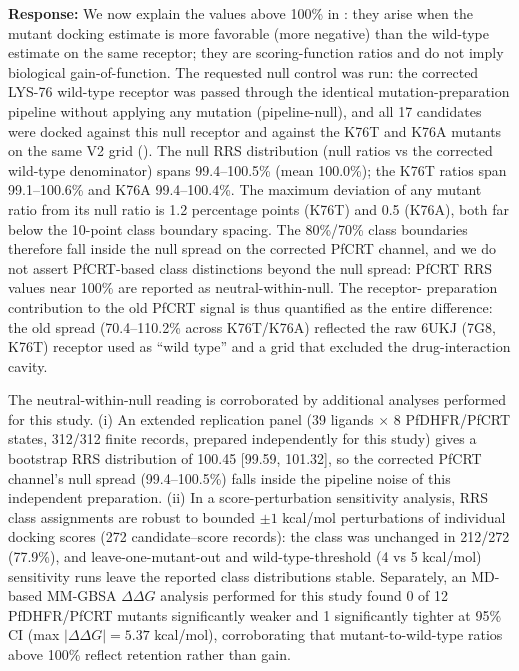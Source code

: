 \documentclass[11pt]{article}
\begin{document}
\textbf{Response:} We now explain the values above 100\% in : they arise when the
mutant docking estimate is more favorable (more negative) than the wild-type estimate on the
same receptor; they are scoring-function ratios and do not imply biological gain-of-function.
The requested null control was run: the corrected LYS-76 wild-type receptor was passed through
the identical mutation-preparation pipeline without applying any mutation (pipeline-null), and
all 17 candidates were docked against this null receptor and against the K76T and K76A
mutants on the same V2 grid (). The null RRS distribution (null ratios vs the
corrected wild-type denominator) spans 99.4--100.5\% (mean 100.0\%); the K76T ratios span
99.1--100.6\% and K76A 99.4--100.4\%. The maximum deviation of any mutant ratio from its null
ratio is 1.2 percentage points (K76T) and 0.5 (K76A), both far below the 10-point class
boundary spacing. The 80\%/70\% class boundaries therefore fall inside the null spread on the
corrected PfCRT channel, and we do not assert PfCRT-based class distinctions beyond the null
spread: PfCRT RRS values near 100\% are reported as neutral-within-null. The receptor-
preparation contribution to the old PfCRT signal is thus quantified as the entire difference:
the old spread (70.4--110.2\% across K76T/K76A) reflected the raw 6UKJ (7G8, K76T)
receptor used as ``wild type'' and a grid that excluded the drug-interaction cavity.

The neutral-within-null reading is corroborated by additional analyses performed for this study. (i) An extended replication panel (39 ligands
$\times$ 8 PfDHFR/PfCRT states, 312/312 finite records, prepared independently
for this study) gives a bootstrap RRS distribution of 100.45
[99.59, 101.32], so the corrected PfCRT channel's null spread (99.4--100.5\%)
falls inside the pipeline noise of this independent preparation. (ii) In a score-perturbation sensitivity analysis, RRS class assignments are robust to
bounded $\pm1$ kcal/mol perturbations of individual
docking scores (272 candidate--score records): the class was unchanged in
212/272 (77.9\%), and leave-one-mutant-out and wild-type-threshold (4 vs
5 kcal/mol) sensitivity runs leave the reported class distributions stable. Separately, an MD-based MM-GBSA $\Delta\Delta G$ analysis
performed for this study found 0 of 12 PfDHFR/PfCRT mutants significantly weaker
and 1 significantly tighter at 95\% CI (max $|\Delta\Delta G|=5.37$ kcal/mol),
corroborating that mutant-to-wild-type ratios above 100\% reflect retention
rather than gain.
\end{document}
